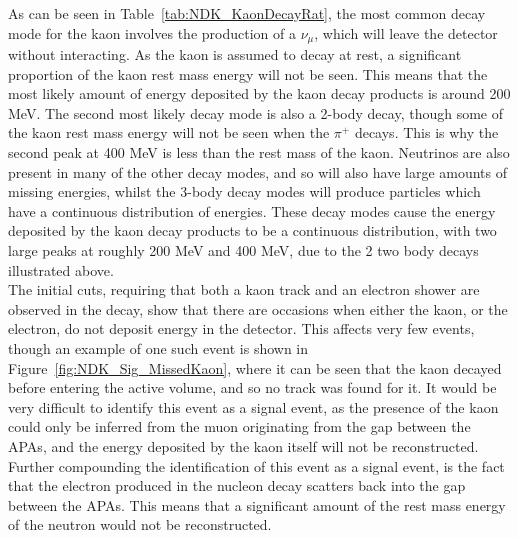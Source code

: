 As can be seen in Table~\ref{tab:NDK_KaonDecayRat}, the most common decay mode for the kaon involves the production of a $\nu_{\mu}$, which will leave the detector without interacting. As the kaon is assumed to decay at rest, a significant proportion of the kaon rest mass energy will not be seen. This means that the most likely amount of energy deposited by the kaon decay products is around 200 MeV. The second most likely decay mode is also a 2-body decay, though some of the kaon rest mass energy will not be seen when the $\pi^{+}$ decays. This is why the second peak at 400 MeV is less than the rest mass of the kaon. Neutrinos are also present in many of the other decay modes, and so will also have large amounts of missing energies, whilst the 3-body decay modes will produce particles which have a continuous distribution of energies. These decay modes cause the energy deposited by the kaon decay products to be a continuous distribution, with two large peaks at roughly 200 MeV and 400 MeV, due to the 2 two body decays illustrated above. \\

The initial cuts, requiring that both a kaon track and an electron shower are observed in the decay, show that there are occasions when either the kaon, or the electron, do not deposit energy in the detector. This affects very few events, though an example of one such event is shown in Figure~\ref{fig:NDK_Sig_MissedKaon}, where it can be seen that the kaon decayed before entering the active volume, and so no track was found for it. It would be very difficult to identify this event as a signal event, as the presence of the kaon could only be inferred from the muon originating from the gap between the APAs, and the energy deposited by the kaon itself will not be reconstructed. Further compounding the identification of this event as a signal event, is the fact that the electron produced in the nucleon decay scatters back into the gap between the APAs. This means that a significant amount of the rest mass energy of the neutron would not be reconstructed. \\

